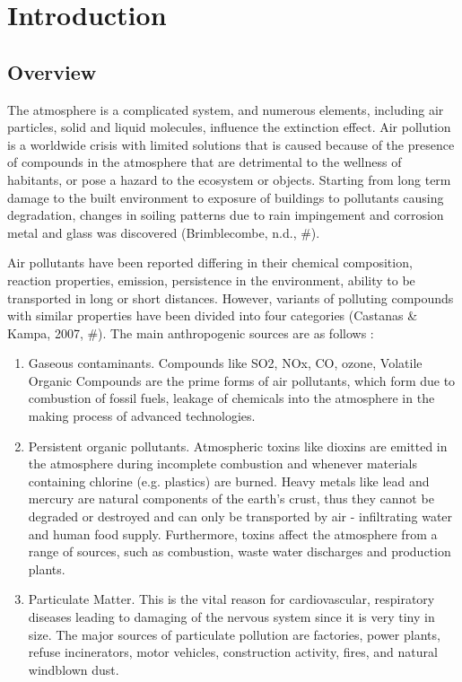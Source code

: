 \chapter{Introduction}

\section{Overview}

The atmosphere is a complicated system, and numerous elements, including air particles, solid and liquid molecules, influence the extinction effect. Air pollution is a worldwide crisis with limited solutions that is caused because of the presence of compounds in the atmosphere that are detrimental to the wellness of habitants, or pose a hazard to the ecosystem or objects. Starting from long term damage to the built environment to exposure of buildings to pollutants causing degradation, changes in soiling patterns due to rain impingement and corrosion metal and glass was discovered (Brimblecombe, n.d., #).  

Air pollutants have been reported differing in their chemical composition, reaction properties, emission, persistence in the environment, ability to be transported in long or short distances. However, variants of polluting compounds with similar properties have been divided into four categories (Castanas & Kampa, 2007, #). The main anthropogenic sources are as follows : 

\begin{enumerate}
\item Gaseous contaminants. 
Compounds like SO2, NOx, CO, ozone, Volatile Organic Compounds are the prime forms of air pollutants, which form due to combustion of fossil fuels, leakage of chemicals into the atmosphere in the making process of advanced technologies. 

\item Persistent organic pollutants.
Atmospheric toxins like dioxins are emitted in the atmosphere during incomplete combustion and whenever materials containing chlorine (e.g. plastics) are burned. Heavy metals like lead and mercury are natural components of the earth’s crust, thus they cannot be degraded or destroyed and can only be transported by air - infiltrating water and human food supply. Furthermore, toxins affect the atmosphere from a range of sources, such as combustion, waste water discharges and production plants.

\item Particulate Matter.
This is the vital reason for cardiovascular, respiratory diseases leading to damaging of the nervous system since it is very tiny in size. The major sources of particulate pollution are factories, power plants, refuse incinerators, motor vehicles, construction activity, fires, and natural windblown dust. 

\end{enumerate}

